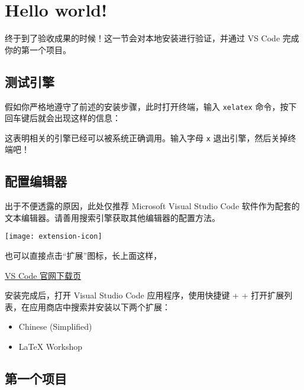 \section{Hello world!}
\label{sec:hw}

\begin{widepar}
  终于到了验收成果的时候！这一节会对本地安装进行验证，并通过 VS Code 完成你的第一个项目。
\end{widepar}


\subsection{测试引擎}

假如你严格地遵守了前述的安装步骤，此时打开终端，输入 \texttt{xelatex} 命令，按下回车键后就会出现这样的信息：


这表明相关的引擎已经可以被系统正确调用。输入字母 \texttt{x} 退出引擎，然后关掉终端吧！

\subsection{配置编辑器}

出于不便透露的原因，此处仅推荐 Microsoft Visual Studio Code 软件作为配套的文本编辑器。请善用搜索引擎获取其他编辑器的配置方法。

\begin{marginfigure}
\centering
\texttt{[image: extension-icon]}
\caption{也可以直接点击“扩展”图标，长上面这样，}
\end{marginfigure}

\medskip
\href{https://code.visualstudio.com/Download}{\faCloudDownload* VS Code 官网下载页}
\medskip

安装完成后，打开 Visual Studio Code 应用程序，使用快捷键  +  +  打开扩展列表，在应用商店中搜索并安装以下两个扩展：
\begin{itemize}
  \item Chinese (Simplified)
  \item LaTeX Workshop
\end{itemize}


\subsection{第一个项目}

